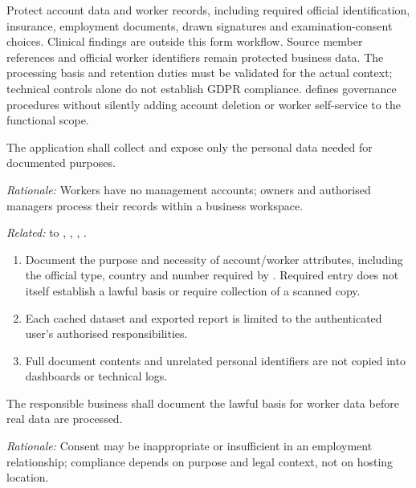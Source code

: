 \label{sec:nfr-privacy}
Protect account data and worker records, including required official identification,
insurance, employment documents, drawn signatures and examination-consent choices.
Clinical findings are outside this form workflow. Source member references and
official worker identifiers remain protected business data. The processing basis and
retention duties must be validated for the actual context; technical controls alone
do not establish GDPR compliance.  defines governance procedures without
silently adding account deletion or worker self-service to the functional scope.

\label{nfr:PRV-01}
The application shall collect and expose only the personal data needed for documented purposes.

\textit{Rationale:} Workers have no management accounts; owners and authorised managers process their records within a business workspace.

\textit{Related:} \hyperref[fr:020]{} to \hyperref[fr:023]{}, \hyperref[fr:038]{}, \hyperref[fr:039]{}, \hyperref[fr:053]{}.
\begin{enumerate}[label=(\alph*),leftmargin=*,itemsep=1pt,topsep=3pt]
\item Document the purpose and necessity of account/worker attributes, including the official type, country and number required by \hyperref[fr:020]{}. Required entry does not itself establish a lawful basis or require collection of a scanned copy.
\item Each cached dataset and exported report is limited to the authenticated user's authorised responsibilities.
\item Full document contents and unrelated personal identifiers are not copied into dashboards or technical logs.
\end{enumerate}

\label{nfr:PRV-02}
The responsible business shall document the lawful basis for worker data before real data are processed.

\textit{Rationale:} Consent may be inappropriate or insufficient in an employment relationship; compliance depends on purpose and legal context, not on hosting location.

